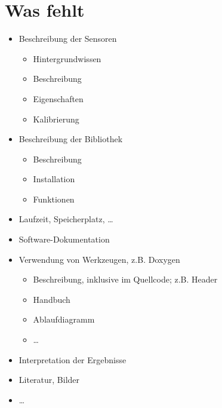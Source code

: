 \section{Was fehlt}

\begin{itemize}
  \item Beschreibung der Sensoren
    \begin{itemize}
      \item Hintergrundwissen
      \item Beschreibung
      \item Eigenschaften
      \item Kalibrierung
    \end{itemize}
  \item Beschreibung der Bibliothek
    \begin{itemize}
      \item Beschreibung
      \item Installation
      \item Funktionen
    \end{itemize}
  \item Laufzeit, Speicherplatz, \ldots
  \item Software-Dokumentation
  \item Verwendung von Werkzeugen, z.B. Doxygen
    \begin{itemize}
      \item Beschreibung, inklusive im Quellcode; z.B. Header
      \item Handbuch
      \item Ablaufdiagramm
      \item \ldots
\end{itemize}
\item Interpretation der Ergebnisse
\item Literatur, Bilder
\item \ldots
\end{itemize}


